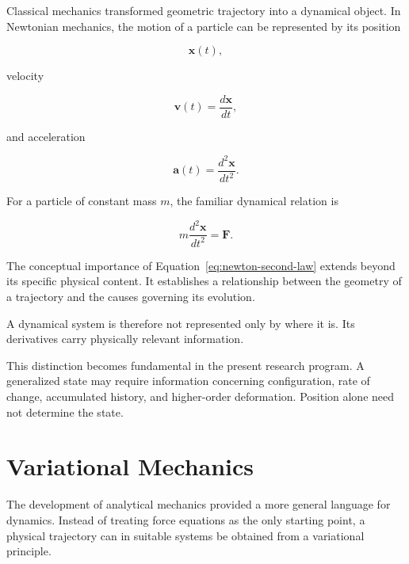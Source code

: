\documentclass[12pt,oneside]{book}
\begin{document}
Classical mechanics transformed geometric trajectory into a
dynamical object. In Newtonian mechanics, the motion of a
particle can be represented by its position

\begin{equation}
    \mathbf{x}(t),
\end{equation}

velocity

\begin{equation}
    \mathbf{v}(t)
    =
    \frac{d\mathbf{x}}{dt},
\end{equation}

and acceleration

\begin{equation}
    \mathbf{a}(t)
    =
    \frac{d^2\mathbf{x}}{dt^2}.
\end{equation}

For a particle of constant mass \(m\), the familiar dynamical
relation is

\begin{equation}
    m\frac{d^2\mathbf{x}}{dt^2}
    =
    \mathbf{F}.
    \label{eq:newton-second-law}
\end{equation}

The conceptual importance of
Equation~\eqref{eq:newton-second-law} extends beyond its
specific physical content. It establishes a relationship
between the geometry of a trajectory and the causes governing
its evolution.

A dynamical system is therefore not represented only by where
it is. Its derivatives carry physically relevant information.

This distinction becomes fundamental in the present research
program. A generalized state may require information concerning
configuration, rate of change, accumulated history, and
higher-order deformation. Position alone need not determine the
state.


\section{Variational Mechanics}
\label{sec:variational-mechanics}

The development of analytical mechanics provided a more general
language for dynamics. Instead of treating force equations as
the only starting point, a physical trajectory can in suitable
systems be obtained from a variational principle.
\end{document}
